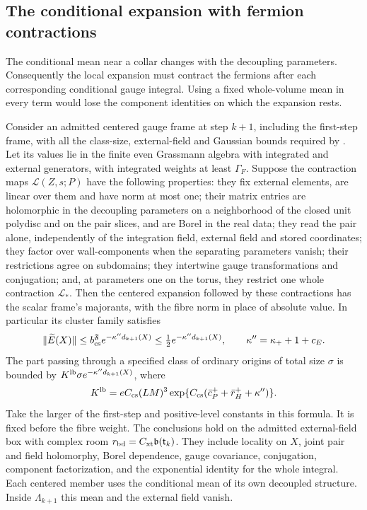 \documentclass[11pt,letterpaper,reqno]{amsart}
\makeatletter
\theoremstyle{definition}
\newcommand{\ms@minorstart}{%
  \pushQED{\qed}\renewcommand{\qedsymbol}{$\blacksquare$}}
\newenvironment{lemma}[1][]{\ms@minorstart\ms@lemma[#1]}
  {\popQED\endms@lemma}
\theoremstyle{remark}
\makeatother
\begin{document}
\subsection{The conditional expansion with fermion contractions}

The conditional mean near a collar changes with the decoupling
parameters. Consequently the local expansion must contract the
fermions after each corresponding conditional gauge integral.
Using a fixed whole-volume mean in every term would lose the
component identities on which the expansion rests.

\begin{lemma}[Local contractions in the centered expansion]
\label{C-399-41}
Consider an admitted centered gauge frame at step $k+1$,
including the first-step frame, with all the class-size,
external-field and Gaussian bounds required by
\cite[Proposition~76.2 and Theorem~AF]{YMM1}.
Let its values lie in the finite even Grassmann algebra with
integrated and external generators, with integrated weights
at least $\Gamma_F$. Suppose the contraction maps
$\mathscr L(Z,s;P)$ have the following properties:
they fix external elements, are linear over them and have
norm at most one; their matrix entries are holomorphic in
the decoupling parameters on a neighborhood of the closed
unit polydisc and on the pair slices, and are Borel in the
real data; they read the pair alone, independently of the
integration field, external field and stored coordinates;
they factor over wall-components when the separating
parameters vanish; their restrictions agree on subdomains;
they intertwine gauge transformations and conjugation; and,
at parameters one on the torus, they restrict one whole
contraction $\mathscr L_*$. Then the centered expansion
followed by these contractions has the scalar frame's
majorants, with the fibre norm in place of absolute value.
In particular its cluster family satisfies
\[
 \|\widetilde E(X)\|
 \le b_{\rm cs}^{\mathfrak F}e^{-\kappa''d_{k+1}(X)}
 \le\tfrac12e^{-\kappa''d_{k+1}(X)},\qquad
 \kappa''=\kappa_++1+c_E.
\]
The part passing through a specified class of ordinary
origins of total size $\sigma$ is bounded by
$K^{\rm lb}\sigma e^{-\kappa''d_{k+1}(X)}$, where
\[
 K^{\rm lb}
 =eC_{\rm cs}(LM)^3
  \exp\{C_{\rm cs}(\bar c_P^++\bar r_H^++\kappa'')\}.
\]
Take the larger of the first-step and positive-level constants
in this formula. It is fixed before the fibre weight.
The conclusions hold on the admitted external-field box
with complex room $r_{\rm bd}=C_{\rm xt}\mathfrak b(\mathsf t_k)$.
They include locality on $X$, joint pair and field holomorphy,
Borel dependence, gauge covariance, conjugation, component
factorization, and the exponential identity for the whole
integral. Each centered member uses the conditional mean
of its own decoupled structure. Inside $\Lambda_{k+1}$
this mean and the external field vanish.
\end{lemma}
\end{document}
